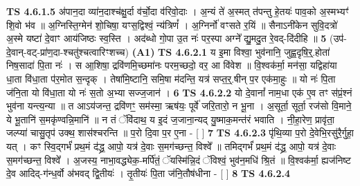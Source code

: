 \documentclass[17pt]{extarticle}
\begin{document}
                                \textbf{ TS 4.6.1.5} \newline
                  अ॑पान॒दा व्या॑न॒दाश्च॑क्षु॒र्दा व॑र्चो॒दा व॑रिवो॒दाः । अ॒न्यं ते॑ अ॒स्मत् त॑पन्तु हे॒तयः॑ पाव॒को अ॒स्मभ्यꣳ॑ शि॒वो भ॑व ॥ अ॒ग्निस्ति॒ग्मेन॑ शो॒चिषा॒ यꣳस॒द्विश्वं॒ न्य॑त्रिणं᳚ । अ॒ग्निर्नो॑ वꣳसते र॒यिं ॥ सैनाऽनी॑केन सुवि॒दत्रो॑ अ॒स्मे यष्टा॑ दे॒वाꣳ आय॑जिष्ठः स्व॒स्ति । अद॑ब्धो गो॒पा उ॒त नः॑ पर॒स्पा अग्ने᳚ द्यु॒मदु॒त रे॒वद्-दि॑दीहि ॥ \textbf{  5} \newline
                  \newline
                      (उप॑-दे॒वान्-वट्-प्रा॑ण॒दा-श्चतु॑श्चत्वारिꣳशच्च)  \textbf{(A1)} \newline \newline
                                        \textbf{ TS 4.6.2.1} \newline
                  य इ॒मा विश्वा॒ भुव॑नानि॒ जुह्व॒दृषि॒र्॒.होता॑ निष॒सादा॑ पि॒ता नः॑ । स आ॒शिषा॒ द्रवि॑णमि॒च्छमा॑नः परम॒च्छदो॒ वर॒ आ वि॑वेश ॥ वि॒श्वक॑र्मा॒ मन॑सा॒ यद्विहा॑या धा॒ता वि॑धा॒ता प॑र॒मोत स॒न्दृक् । तेषा॑मि॒ष्टानि॒ समि॒षा म॑दन्ति॒ यत्र॑ सप्त॒र्॒.षीन् प॒र एक॑मा॒हुः ॥ यो नः॑ पि॒ता ज॑नि॒ता यो वि॑धा॒ता यो नः॑ स॒तो अ॒भ्या सज्ज॒जान॑ । \textbf{  6} \newline
                  \newline
                                \textbf{ TS 4.6.2.2} \newline
                  यो दे॒वानां᳚ नाम॒धा एक॑ ए॒व तꣳ स॑प्रं॒श्नं भुव॑ना यन्त्य॒न्या ॥ त आऽय॑जन्त॒ द्रवि॑णꣳ॒॒ सम॑स्मा॒ ऋष॑यः॒ पूर्वे॑ जरि॒तारो॒ न भू॒ना । अ॒सूर्ता॒ सूर्ता॒ रज॑सो वि॒माने॒ ये भू॒तानि॑ स॒मकृ॑ण्वन्नि॒मानि॑ ॥ न तं ॅवि॑दाथ॒ य इ॒दं ज॒जाना॒न्यद् यु॒ष्माक॒मन्त॑रं भवाति । नी॒हा॒रेण॒ प्रावृ॑ता॒ जल्प्या॑ चासु॒तृप॑ उक्थ॒ शास॑श्चरन्ति ॥ प॒रो दि॒वा प॒र ए॒ना - [  ] \textbf{  7} \newline
                  \newline
                                \textbf{ TS 4.6.2.3} \newline
                  पृ॑थि॒व्या प॒रो दे॒वेभि॒रसु॑रै॒र्गुहा॒ यत् । कꣳ स्वि॒द्गर्भं॑ प्रथ॒मं द॑द्ध्र॒ आपो॒ यत्र॑ दे॒वाः स॒मग॑च्छन्त॒ विश्वे᳚ ॥ तमिद्गर्भं॑ प्रथ॒मं द॑द्ध्र॒ आपो॒ यत्र॑ दे॒वाः स॒मग॑च्छन्त॒ विश्वे᳚ । अ॒जस्य॒ नाभा॒वद्ध्येक॒-मर्पि॑तं॒ ॅयस्मि॑न्नि॒दं ॅविश्वं॒ भुव॑न॒मधि॑ श्रि॒तं ॥ वि॒श्वक॑र्मा॒ ह्यज॑निष्ट दे॒व आदिद्-ग॑न्ध॒र्वो अ॑भवद् द्वि॒तीयः॑ । तृ॒तीयः॑ पि॒ता ज॑नि॒तौष॑धीना - [  ] \textbf{  8} \newline
                  \newline
                                \textbf{ TS 4.6.2.4} \newline
\end{document}
